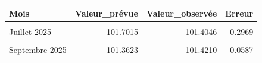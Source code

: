 \centering
\centering
\begin{tabular}[t]{lrrr}
\toprule
Mois & Valeur\_prévue & Valeur\_observée & Erreur\\
\midrule
\cellcolor{gray!10}{Juin 2025} & \cellcolor{gray!10}{101.7176} & \cellcolor{gray!10}{101.3877} & \cellcolor{gray!10}{-0.3299}\\
Juillet 2025 & 101.7015 & 101.4046 & -0.2969\\
\cellcolor{gray!10}{Août 2025} & \cellcolor{gray!10}{101.3804} & \cellcolor{gray!10}{101.4046} & \cellcolor{gray!10}{0.0242}\\
Septembre 2025 & 101.3623 & 101.4210 & 0.0587\\
\bottomrule
\end{tabular}

